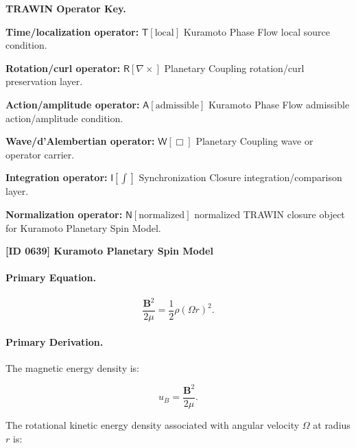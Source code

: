 \par\vspace{0.45\baselineskip}
\noindent\begin{minipage}[t]{\linewidth}
\begingroup
\small
\raggedright
\textbf{TRAWIN Operator Key.}\par
\noindent\textbf{Time/localization operator:} $\mathsf{T}\!\left[\mathrm{local}\right]$ Kuramoto Phase Flow local source condition.\par
\noindent\textbf{Rotation/curl operator:} $\mathsf{R}\!\left[\nabla\times\right]$ Planetary Coupling rotation/curl preservation layer.\par
\noindent\textbf{Action/amplitude operator:} $\mathsf{A}\!\left[\mathrm{admissible}\right]$ Kuramoto Phase Flow admissible action/amplitude condition.\par
\noindent\textbf{Wave/d'Alembertian operator:} $\mathsf{W}\!\left[\Box\right]$ Planetary Coupling wave or operator carrier.\par
\noindent\textbf{Integration operator:} $\mathsf{I}\!\left[\int\right]$ Synchronization Closure integration/comparison layer.\par
\noindent\textbf{Normalization operator:} $\mathsf{N}\!\left[\mathrm{normalized}\right]$ normalized TRAWIN closure object for Kuramoto Planetary Spin Model.\par
\endgroup
\end{minipage}

\clearpage
\noindent\textbf{[ID 0639] Kuramoto Planetary Spin Model}\par
\vspace{0.35em}
\paragraph{Primary Equation.}
\begin{equation}
\frac{\mathbf{B}^2}{2\mu}
=
\frac{1}{2}\rho(\Omega r)^2 .
\end{equation}

\paragraph{Primary Derivation.}
The magnetic energy density is:

\begin{equation}
u_B
=
\frac{\mathbf{B}^2}{2\mu}.
\end{equation}

The rotational kinetic energy density associated with angular velocity $\Omega$ at radius $r$ is:

